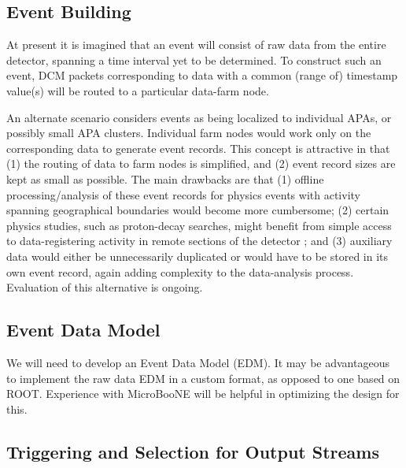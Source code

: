 \subsection{Event Building}

At present it is imagined that an event will consist of raw data from the 
entire detector, spanning a time interval yet to be determined.  To construct 
such an event, DCM packets corresponding to data with a common (range of) 
timestamp value(s) will be routed to a particular data-farm node.  

An alternate scenario considers events as being localized to individual 
APAs, or possibly small APA clusters.  Individual farm nodes would work 
only on the corresponding data to generate event records.
This concept is attractive in that (1) the routing of data to farm nodes 
is simplified, and (2) event record sizes are kept as small as possible.  
The main drawbacks are that (1) offline processing/analysis of these event 
records for physics events with activity spanning geographical 
boundaries would become more cumbersome; (2) certain physics studies, such 
as proton-decay searches, might benefit from 
simple access to data-registering activity in remote sections of the detector 
; and (3) auxiliary data  
would either be unnecessarily duplicated or 
would have to be stored in its own event record, again adding complexity 
to the data-analysis process.  Evaluation of this alternative is ongoing.

\subsection{Event Data Model}

We will need to develop an Event Data Model (EDM).  It may be advantageous 
to implement the raw data EDM in a custom format, as opposed to one based on 
ROOT.  Experience with MicroBooNE will be helpful in optimizing the design 
for this.

\subsection{Triggering and Selection for Output Streams}

